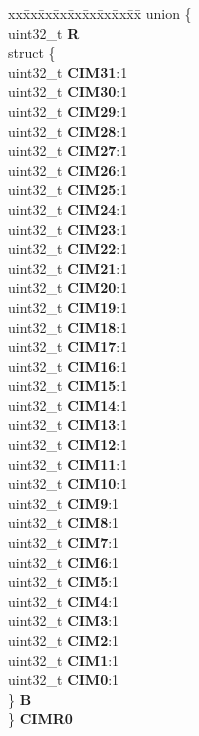 \begin{DoxyCompactItemize}
\begin{tabbing}
\end{tabbing}\item 
\mbox{\label{structADC__tag_ad167b50298621c2199d8a0e72f77b1e4}} 
\begin{tabbing}
xx\=xx\=xx\=xx\=xx\=xx\=xx\=xx\=xx\=\kill
union \{\\
\>uint32\_t {\bfseries R}\\
\>struct \{\\
\>\>uint32\_t {\bfseries CIM31}:1\\
\>\>uint32\_t {\bfseries CIM30}:1\\
\>\>uint32\_t {\bfseries CIM29}:1\\
\>\>uint32\_t {\bfseries CIM28}:1\\
\>\>uint32\_t {\bfseries CIM27}:1\\
\>\>uint32\_t {\bfseries CIM26}:1\\
\>\>uint32\_t {\bfseries CIM25}:1\\
\>\>uint32\_t {\bfseries CIM24}:1\\
\>\>uint32\_t {\bfseries CIM23}:1\\
\>\>uint32\_t {\bfseries CIM22}:1\\
\>\>uint32\_t {\bfseries CIM21}:1\\
\>\>uint32\_t {\bfseries CIM20}:1\\
\>\>uint32\_t {\bfseries CIM19}:1\\
\>\>uint32\_t {\bfseries CIM18}:1\\
\>\>uint32\_t {\bfseries CIM17}:1\\
\>\>uint32\_t {\bfseries CIM16}:1\\
\>\>uint32\_t {\bfseries CIM15}:1\\
\>\>uint32\_t {\bfseries CIM14}:1\\
\>\>uint32\_t {\bfseries CIM13}:1\\
\>\>uint32\_t {\bfseries CIM12}:1\\
\>\>uint32\_t {\bfseries CIM11}:1\\
\>\>uint32\_t {\bfseries CIM10}:1\\
\>\>uint32\_t {\bfseries CIM9}:1\\
\>\>uint32\_t {\bfseries CIM8}:1\\
\>\>uint32\_t {\bfseries CIM7}:1\\
\>\>uint32\_t {\bfseries CIM6}:1\\
\>\>uint32\_t {\bfseries CIM5}:1\\
\>\>uint32\_t {\bfseries CIM4}:1\\
\>\>uint32\_t {\bfseries CIM3}:1\\
\>\>uint32\_t {\bfseries CIM2}:1\\
\>\>uint32\_t {\bfseries CIM1}:1\\
\>\>uint32\_t {\bfseries CIM0}:1\\
\>\} {\bfseries B}\\
\} {\bfseries CIMR0}\\


\end{tabbing}
\end{DoxyCompactItemize}
